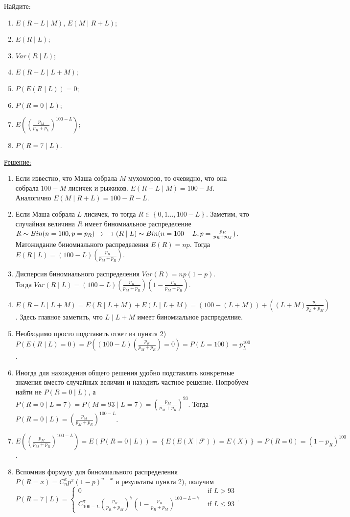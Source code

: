 \documentclass[a4paper]{article}
\begin{document}
 Найдите:
\begin{enumerate}
	\item $E(R+L \mid M)$, $E(M \mid R+L)$;
	\item $E(R \mid L)$;
	\item $Var(R \mid L)$;
	\item $E(R+L \mid L+M)$;
	\item $P(E(R \mid L))=0$;
	\item $P(R=0 \mid L)$;
	\item $E((\frac{p_{M}}{p_{R}+p_{L}})^{100-L})$;
	\item $P(R=7\mid L)$.
\end{enumerate}
\par{\underline{Решение:}}
\begin{enumerate}
	\item Если известно, что Маша собрала $M$ мухоморов, то очевидно, что она собрала $100 - M$ лисичек и рыжиков. $E(R+L \mid M) = 100 - M$.
	Аналогично $E(M \mid R+L) = 100 - R - L$.
	\item Если Маша собрала $L$ лисичек, то тогда $R\in \left \{0, 1\ldots, 100 - L  \right \}$. Заметим, что случайная величина $R$ имеет биномиальное распределение $R \sim Bin(n=100, p =p_{R}) \rightarrow \\ \rightarrow (R\mid L) \sim Bin(n =100-L,p =\frac{p_{R}}{p_{R}+p_{M}})$. \\ Матожидание биномиального распределения $E(R) = np$. Тогда $E(R \mid L) = (100-L)(\frac{p_{R}}{p_{M}+p_{R}})$.
	\item Дисперсия биномиального распределения $Var(R) = np(1-p)$. \\ Тогда $Var(R\mid L)=(100-L)(\frac{p_{R}}{p_{M}+p_{R}})(1-\frac{p_{R}}{p_{M}+p_{R}})$.
	\item $E(R+L\mid L+M) = E(R\mid L+M) + E(L\mid L +M) = (100-(L+M)) + ((L+M)\frac{p_{L}}{p_{L}+p_{M}})$. Здесь главное заметить, что $L\mid L +M$ имеет биномиальное распределние.
	\item Необходимо просто подставить ответ из пункта 2) \\ $P(E(R\mid L)=0) = P((100-L)(\frac{p_{R}}{p_{M}+p_{R}})=0) = P(L=100) =p_{L}^{100}$.
	\item Иногда для нахождения общего решения удобно подставлять конкретные значения вместо случайных величин и находить частное решение. Попробуем найти не $P(R=0\mid L)$,  а \\ $P(R=0\mid L=7) = P(M=93\mid L=7) = (\frac{p_{M}}{p_{M}+p_{R}})^{93}$. Тогда $P(R=0\mid L) = (\frac{p_{M}}{p_{M}+p_{R}})^{100 - L}$.
	\item $E((\frac{p_{M}}{p_{M}+p_{R}})^{100 - L})=E(P(R=0\mid L))=\left \{ E(E(X\mid \mathcal{F}))=E(X) \right \} = P(R=0)=(1-p_{R})^{100}$.
	\item Вспомнив формулу для биномиального распределения $P(R=x)=C_{n}^{x}p^{x}(1-p)^{n-x}$ и результаты пункта 2), получим $P(R=7\mid L)=\begin{cases}
	0 & \text{ if } L > 93\\
	C_{100-L}^{7}(\frac{p_{R}}{p_{R}+p_{M}})^{7}(1-\frac{p_{R}}{p_{R}+p_{M}})^{100-L-7} &
  \text{ if } L \leq  93 
  \end{cases}$.
\end{enumerate}
\end{document}
